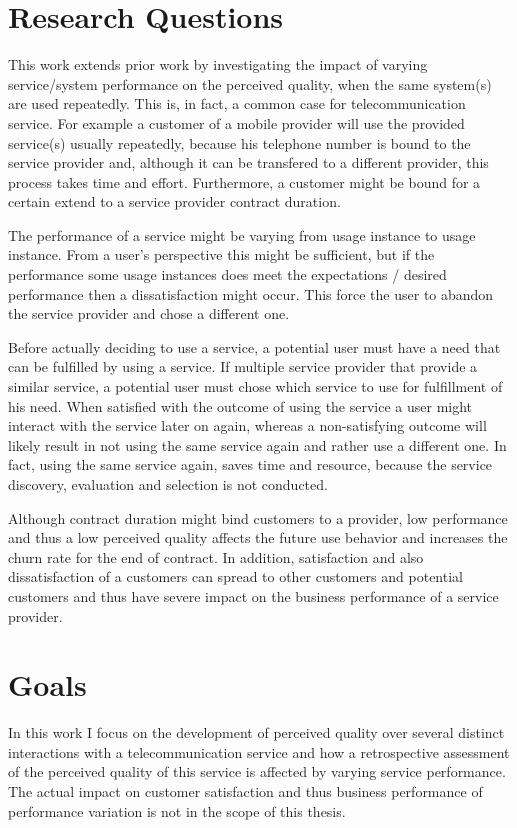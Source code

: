 \section{Research Questions}
This work extends prior work by investigating the impact of varying service/system performance on the perceived quality, when the same system(s) are used repeatedly.
This is, in fact, a common case for telecommunication service.
For example a customer of a mobile  provider will use the provided service(s) usually repeatedly, because his telephone number is bound to the service provider and, although it can be transfered to a different provider, this process takes time and effort.
Furthermore, a customer might be bound for a certain extend to a service provider contract duration.

The performance of a service might be varying from usage instance to usage instance.
From a user's perspective this might be sufficient, but if the performance some usage instances does meet the expectations / desired performance then a dissatisfaction might occur.
This force the user to abandon the service provider and chose a different one.


Before actually deciding to use a service, a potential user must have a need that can be fulfilled by using a service. %
If multiple service provider that provide a similar service, a potential user must chose which service to use for fulfillment of his need.
When satisfied with the outcome of using the service a user might interact with the service later on again, whereas a non-satisfying outcome will likely result in not using the same service again and rather use a different one.
In fact, using the same service again, saves time and resource, because the service discovery, evaluation and selection is not conducted.

Although contract duration might bind customers to a provider, low performance and thus a low perceived quality affects the future use behavior and increases the churn rate for the end of contract.
In addition, satisfaction and also dissatisfaction of a customers can spread to other customers and potential customers and thus have severe impact on the business performance of a service provider.

\section{Goals}
In this work I focus on the development of perceived quality over several distinct interactions with a telecommunication service and how a retrospective assessment of the perceived quality of this service is affected by varying service performance.
The actual impact on customer satisfaction and thus business performance of performance variation is not in the scope of this thesis.

